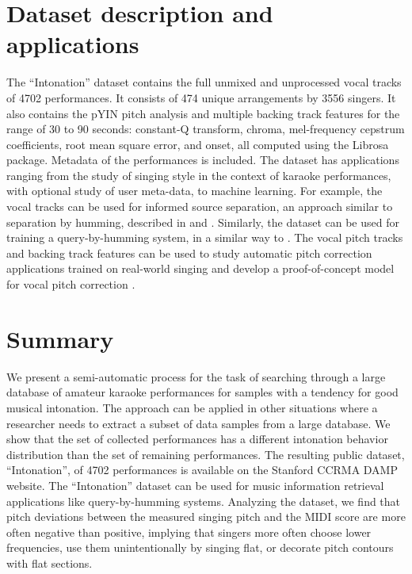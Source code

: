 \section{Dataset description and applications}
The ``Intonation'' dataset contains the full unmixed and unprocessed vocal tracks of 4702 performances. It consists of 474 unique arrangements by 3556 singers. It also contains the pYIN pitch analysis and multiple backing track features for the range of 30 to 90 seconds: constant-Q transform, chroma, mel-frequency cepstrum coefficients, root mean square error, and onset, all computed using the Librosa \cite{mcfee2015librosa} package. Metadata of the performances is included. The dataset has applications ranging from the study of singing style in the context of karaoke performances, with optional study of user meta-data, to machine learning. For example, the vocal tracks can be used for informed source separation, an approach similar to separation by humming, described in \cite{smaragdis2009separation} and \cite{liutkus2012informed}. Similarly, the dataset can be used for training a query-by-humming system, in a similar way to \cite{huq2010crowdsourcing}. The vocal pitch tracks and backing track features can be used to study automatic pitch correction applications trained on real-world singing and develop a proof-of-concept model for vocal pitch correction \cite{wager2018pitch}.

\section{Summary}
We present a semi-automatic process for the task of searching through a large database of amateur karaoke performances for samples with a tendency for good musical intonation. The approach can be applied in other situations where a researcher needs to extract a subset of data samples from a large database. We show that the set of collected performances has a different intonation behavior distribution than the set of remaining performances. The resulting public dataset, ``Intonation'', of 4702 performances is available on the Stanford CCRMA DAMP website. The ``Intonation'' dataset can be used for music information retrieval applications like query-by-humming systems. Analyzing the dataset, we find that pitch deviations between the measured singing pitch and the MIDI score are more often negative than positive, implying that singers more often choose lower frequencies, use them unintentionally by singing flat, or decorate pitch contours with flat sections.